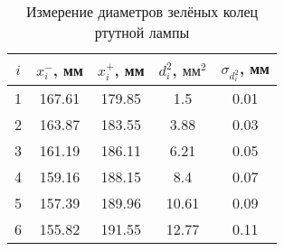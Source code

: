 \begin{table}[h]
	\caption{Измерение диаметров зелёных колец ртутной лампы}
			\begin{center}
				\begin{tabular}{|c|c|c|c|c|}
					\hline
          $ i $ & $ x_i^- $, мм & $ x_i^+ $, мм & $ d_i^2 $, $ \text{мм}^2 $ & $ \sigma_{d_i^2} $, мм\\ 
					\hline
					1 & 167.61 & 179.85 & 1.5 & 0.01 \\\hline
					2 & 163.87 & 183.55 & 3.88 & 0.03 \\\hline
					3 & 161.19 & 186.11 & 6.21 & 0.05 \\\hline
					4 & 159.16 & 188.15 & 8.4 & 0.07 \\\hline
					5 & 157.39 & 189.96 & 10.61 & 0.09 \\\hline
					6 & 155.82 & 191.55 & 12.77 & 0.11 \\
					\hline
				\end{tabular}
			\end{center}
			\label{Gr_table}
\end{table}
